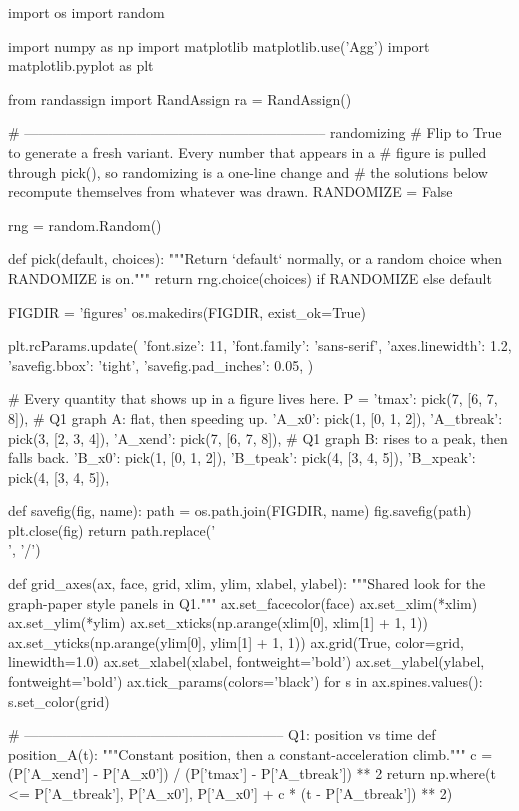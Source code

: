 \documentclass[12pt]{exam}
\begin{document}
\assessmentheader

\begin{pycode}
import os
import random

import numpy as np
import matplotlib
matplotlib.use('Agg')
import matplotlib.pyplot as plt

from randassign import RandAssign
ra = RandAssign()

# ----------------------------------------------------------------- randomizing
# Flip to True to generate a fresh variant. Every number that appears in a
# figure is pulled through pick(), so randomizing is a one-line change and
# the solutions below recompute themselves from whatever was drawn.
RANDOMIZE = False

rng = random.Random()


def pick(default, choices):
    """Return `default` normally, or a random choice when RANDOMIZE is on."""
    return rng.choice(choices) if RANDOMIZE else default


FIGDIR = 'figures'
os.makedirs(FIGDIR, exist_ok=True)

plt.rcParams.update({
    'font.size': 11,
    'font.family': 'sans-serif',
    'axes.linewidth': 1.2,
    'savefig.bbox': 'tight',
    'savefig.pad_inches': 0.05,
})

# Every quantity that shows up in a figure lives here.
P = {
    'tmax':      pick(7, [6, 7, 8]),
    # Q1 graph A: flat, then speeding up.
    'A_x0':      pick(1, [0, 1, 2]),
    'A_tbreak':  pick(3, [2, 3, 4]),
    'A_xend':    pick(7, [6, 7, 8]),
    # Q1 graph B: rises to a peak, then falls back.
    'B_x0':      pick(1, [0, 1, 2]),
    'B_tpeak':   pick(4, [3, 4, 5]),
    'B_xpeak':   pick(4, [3, 4, 5]),
}


def savefig(fig, name):
    path = os.path.join(FIGDIR, name)
    fig.savefig(path)
    plt.close(fig)
    return path.replace('\\', '/')


def grid_axes(ax, face, grid, xlim, ylim, xlabel, ylabel):
    """Shared look for the graph-paper style panels in Q1."""
    ax.set_facecolor(face)
    ax.set_xlim(*xlim)
    ax.set_ylim(*ylim)
    ax.set_xticks(np.arange(xlim[0], xlim[1] + 1, 1))
    ax.set_yticks(np.arange(ylim[0], ylim[1] + 1, 1))
    ax.grid(True, color=grid, linewidth=1.0)
    ax.set_xlabel(xlabel, fontweight='bold')
    ax.set_ylabel(ylabel, fontweight='bold')
    ax.tick_params(colors='black')
    for s in ax.spines.values():
        s.set_color(grid)


# -------------------------------------------------------- Q1: position vs time
def position_A(t):
    """Constant position, then a constant-acceleration climb."""
    c = (P['A_xend'] - P['A_x0']) / (P['tmax'] - P['A_tbreak']) ** 2
    return np.where(t <= P['A_tbreak'], P['A_x0'],
                    P['A_x0'] + c * (t - P['A_tbreak']) ** 2)



\end{pycode}
\end{document}
